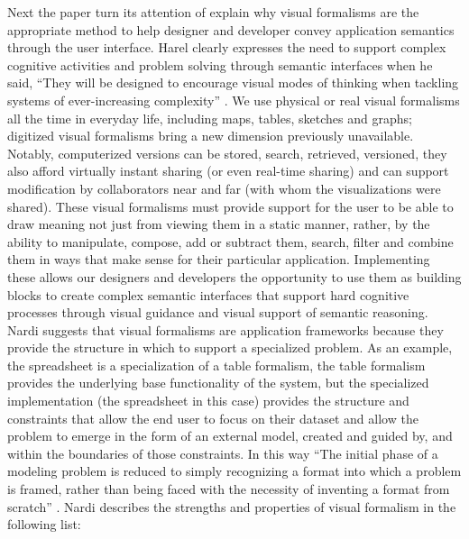 \documentclass{sig-alternate}
\begin{document}
Next the paper turn its attention of explain why visual formalisms are the
appropriate method to help designer and developer convey application semantics through the user interface.
Harel  clearly expresses the need to support complex cognitive activities and
problem solving through semantic interfaces when he said, ``They will be
designed to encourage visual modes of thinking when tackling systems of
ever-increasing complexity'' \cite{Harel:1988:VisualFormalisms}. We use physical
or real visual formalisms all the time in everyday life, including maps, tables,
sketches and graphs; digitized visual formalisms bring a new dimension
previously unavailable. Notably, computerized versions can be stored, search, retrieved, versioned, they also afford virtually instant sharing (or even
real-time sharing) and can support modification by collaborators near and far
(with whom the visualizations were shared). These visual formalisms must provide
support for the user to be able to draw meaning not just from viewing them in a
static manner, rather, by the ability to manipulate, compose, add or subtract
them, search, filter and combine them in ways that make sense for their
particular application.  Implementing these allows our designers and developers
the opportunity to use them as building blocks to create complex semantic
interfaces that support hard cognitive processes through visual guidance and
visual support of semantic reasoning. Nardi suggests that visual formalisms are
application frameworks because they provide the structure in which to support a
specialized problem. As an example, the spreadsheet is a specialization of a
table formalism, the table formalism provides the underlying base functionality
of the system, but the specialized implementation (the spreadsheet in this case)
provides the structure and constraints that allow the end user to focus on their
dataset and allow the problem to emerge in the form of an external model,
created and guided by, and within the boundaries of those constraints. In this
way ``The initial phase of a modeling problem is reduced to simply recognizing a
format into which a problem is framed, rather than being faced with the
necessity of inventing a format from scratch''
\cite{Nardi:90:TheSpreadsheetInterface}. Nardi describes the strengths and
properties of visual formalism in the following list:
\end{document}
